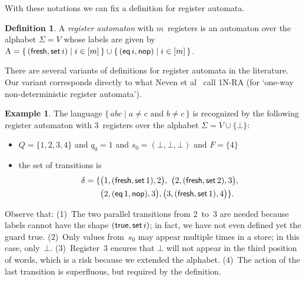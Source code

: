 \documentclass[9pt, preprint]{sigplanconf} %
\theoremstyle{definition}
\newtheorem{definition}{Definition}
\newtheorem{example}{Example}
\theoremstyle{remark}
\begin{document}
With these notations we can fix a definition for register automata.

\begin{definition}
A \emph{register automaton} with $m$~registers is an automaton over the alphabet $\Sigma=V$ whose labels are given by $\Lambda=\{\,({\sf fresh},{\sf set}\,i)\mid i\in[m]\,\}\cup\{\, ({\sf eq}\,i, {\sf nop})  \mid i\in[m] \,\}$.
\label{def:ra}
\end{definition}

There are several variants of definitions for register automata in the literature.
Our variant corresponds directly to what Neven et al~\cite{dblp:conf/mfcs/nevensv01} call 1N-RA (for `one-way non-deterministic register automata').

\begin{example}\label{ex:ra1}
The language $\{\,abc\mid\text{$a\ne c$ and $b\ne c$}\,\}$ is recognized by the following register automaton with $3$~registers over the alphabet $\Sigma=V\cup\{\bot\}$:
\begin{itemize}
\item $Q=\{1,2,3,4\}$
  and $q_0=1$
  and $s_0=(\bot,\bot,\bot)$
  and $F=\{4\}$
\item the set of transitions is
\begin{align*}\delta =\{ & \bigl(1,({\sf fresh},{\sf set}\,1),2\bigr), \ \bigl(2,({\sf fresh},{\sf set}\,2),3\bigr), \\
& \bigl(2,({\sf eq}\,1,{\sf nop}),3\bigr), \bigl(3,({\sf fresh},{\sf set}\,1),4\bigr) \}.
\end{align*}
\end{itemize}
Observe that:
(1)~The two parallel transitions from 2~to~3 are needed because labels cannot have the shape $({\sf true},{\sf set}\,i)$; in fact, we have not even defined yet the guard {\sf true}.
(2)~Only values from~$s_0$ may appear multiple times in a store; in this case, only~$\bot$.
(3)~Register~3 ensures that $\bot$ will not appear in the third position of words, which is a risk because we extended the alphabet.
(4)~The action of the last transition is superfluous, but required by the definition.
\end{example}
\end{document}
